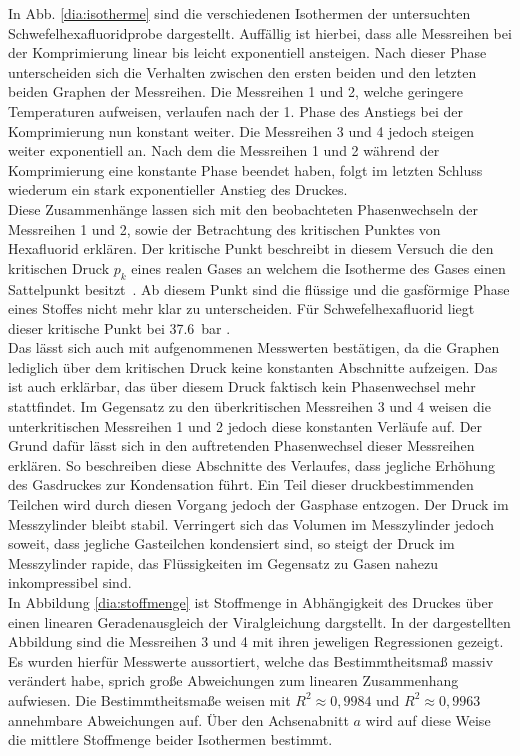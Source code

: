 In Abb. \ref{dia:isotherme} sind die verschiedenen Isothermen der untersuchten Schwefelhexafluoridprobe dargestellt. Auffällig ist hierbei, dass alle Messreihen bei der Komprimierung linear bis leicht exponentiell ansteigen. Nach dieser Phase unterscheiden sich die Verhalten zwischen den ersten beiden und den letzten beiden Graphen der Messreihen. \linebreak 
Die Messreihen 1 und 2, welche geringere Temperaturen aufweisen, verlaufen nach der 1. Phase des Anstiegs bei der Komprimierung nun konstant weiter. Die Messreihen 3 und 4 jedoch steigen weiter exponentiell an. \linebreak 
Nach dem die Messreihen 1 und 2 während der Komprimierung eine konstante Phase beendet haben, folgt im letzten Schluss wiederum ein stark exponentieller Anstieg des Druckes.\\
Diese Zusammenhänge lassen sich mit den beobachteten Phasenwechseln der Messreihen 1 und 2, sowie der Betrachtung des kritischen Punktes von Hexafluorid \linebreak erklären.  
Der kritische Punkt beschreibt in diesem Versuch die den kritischen Druck $p_k$ eines realen Gases an welchem die Isotherme des Gases einen Sattelpunkt \mbox{besitzt \cite{Foth.2006}}. Ab diesem Punkt sind die flüssige und die gasförmige Phase eines Stoffes nicht mehr klar zu unterscheiden. Für Schwefelhexafluorid liegt dieser kritische Punkt bei \SI{37,6}{\bar} \cite{Wikipedia.2020b}.\\
Das lässt sich auch mit aufgenommenen Messwerten bestätigen, da die Graphen lediglich über dem kritischen Druck keine konstanten Abschnitte aufzeigen. Das ist auch erklärbar, das über diesem Druck faktisch kein Phasenwechsel mehr stattfindet.\linebreak 
Im Gegensatz zu den überkritischen Messreihen 3 und 4 weisen die unterkritischen Messreihen 1 und 2 jedoch diese konstanten Verläufe auf. Der Grund dafür lässt sich in den auftretenden Phasenwechsel dieser Messreihen erklären. So beschreiben diese Abschnitte des Verlaufes, dass jegliche Erhöhung des Gasdruckes zur Kondensation führt. Ein Teil dieser druckbestimmenden Teilchen wird durch diesen Vorgang jedoch der Gasphase entzogen. Der Druck im Messzylinder bleibt stabil. Verringert sich das Volumen im Messzylinder jedoch soweit, dass jegliche Gasteilchen kondensiert sind, so steigt der Druck im Messzylinder rapide, das Flüssigkeiten im Gegensatz zu Gasen nahezu inkompressibel sind.\\

In Abbildung \ref{dia:stoffmenge} ist Stoffmenge in Abhängigkeit des Druckes über einen linearen Geradenausgleich der Viralgleichung dargstellt. In der dargestellten Abbildung sind die Messreihen 3 und 4 mit ihren jeweligen Regressionen gezeigt. Es wurden hierfür Messwerte aussortiert, welche das Bestimmtheitsmaß massiv verändert habe, sprich große Abweichungen zum linearen Zusammenhang aufwiesen. Die Bestimmtheitsmaße weisen mit $R^2 \approx 0,9984$ und $R^2 \approx 0,9963$ annehmbare Abweichungen auf. Über den Achsenabnitt $a$ wird auf diese Weise die mittlere Stoffmenge beider Isothermen bestimmt.

